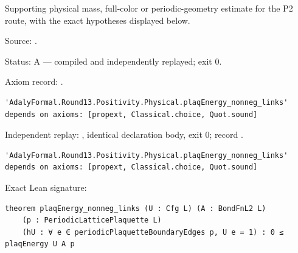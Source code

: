 \begin{theorem}[bp-477]
\label{bp-477}
\leanok
Supporting physical mass, full-color or periodic-geometry estimate for the P2 route, with the exact hypotheses displayed below.

\par Source: \texttt{}.
\par Status: A — compiled and independently replayed; exit 0.
\par Axiom record: \texttt{}.
\begin{verbatim}
'AdalyFormal.Round13.Positivity.Physical.plaqEnergy_nonneg_links' depends on axioms: [propext, Classical.choice, Quot.sound]
\end{verbatim}
\par Independent replay: \texttt{}, identical declaration body, exit 0; record \texttt{}.
\begin{verbatim}
'AdalyFormal.Round13.Positivity.Physical.plaqEnergy_nonneg_links' depends on axioms: [propext, Classical.choice, Quot.sound]
\end{verbatim}
\par Exact Lean signature:
\begin{verbatim}
theorem plaqEnergy_nonneg_links (U : Cfg L) (A : BondFnL2 L)
    (p : PeriodicLatticePlaquette L)
    (hU : ∀ e ∈ periodicPlaquetteBoundaryEdges p, U e = 1) : 0 ≤ plaqEnergy U A p
\end{verbatim}
\end{theorem}


